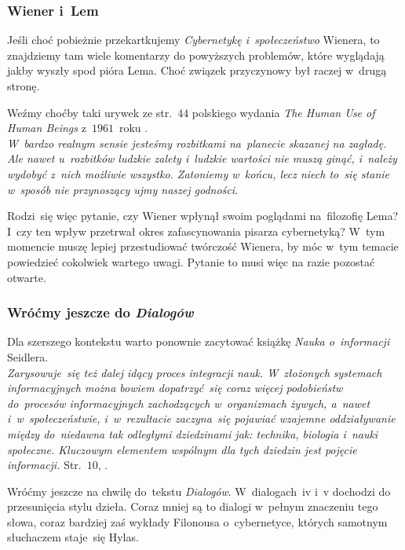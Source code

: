 \documentclass[10pt,t]{beamer}
\begin{document}
\begin{frame}
  \frametitle{Wiener i~Lem}


  Jeśli choć pobieżnie przekartkujemy \textit{Cybernetykę i~społeczeństwo}
  Wienera, to znajdziemy tam wiele komentarzy do powyższych problemów, które
  wyglądają jakby wyszły spod pióra Lema. Choć związek przyczynowy był
  raczej w~drugą stronę.

  Weźmy choćby taki urywek ze str.~$44$ polskiego wydania
  \textit{The Human Use of Human Beings} z~$1961$~roku
  \parencite{Wiener-Cybernetyka-a-spoleczenstwo-Pub-2016}. \\
  \textit{W~bardzo realnym sensie jesteśmy rozbitkami na~planecie skazanej
    na zagładę. Ale nawet u~rozbitków ludzkie zalety i~ludzkie wartości
    nie muszą ginąć, i~należy wydobyć z~nich możliwie wszystko. Zatoniemy
    w~końcu, lecz niech to~się stanie w~sposób nie przynoszący ujmy naszej
    godności.}

  Rodzi~się więc pytanie, czy Wiener wpłynął swoim poglądami na~filozofię
  Lema? I~czy ten wpływ przetrwał okres zafascynowania pisarza cybernetyką?
  W~tym momencie muszę lepiej przestudiować twórczość Wienera, by móc
  w~tym temacie powiedzieć cokolwiek wartego uwagi. Pytanie to musi więc
  na razie pozostać otwarte.

\end{frame}





\begin{frame}
  \frametitle{Wróćmy jeszcze do \textit{Dialogów}}


  Dla szerszego kontekstu warto ponownie zacytować książkę \textit{Nauka
    o~informacji} Seidlera. \\
  \textit{Zarysowuje~się też dalej idący proces integracji nauk.
    W~złożonych systemach informacyjnych można bowiem dopatrzyć~się
    coraz więcej podobieństw do~procesów informacyjnych zachodzących
    w~organizmach żywych, a~nawet i~w~społeczeństwie, i~w~rezultacie
    zaczyna~się pojawiać wzajemne oddziaływanie między do~niedawna tak
    odległymi dziedzinami jak: technika, biologia i~nauki społeczne.
    Kluczowym elementem wspólnym dla tych dziedzin jest pojęcie informacji.}
  Str.~$10$,
  \parencite{Seidler-Nauka-o-informacji-Vol-I-Pub-1983}.

  Wróćmy jeszcze na chwilę do~tekstu \textit{Dialogów}. W~dialogach~iv i~v
  dochodzi do przesunięcia stylu dzieła. Coraz mniej są to dialogi w~pełnym
  znaczeniu tego słowa, coraz bardziej zaś wykłady Filonousa o~cybernetyce,
  których samotnym słuchaczem staje~się Hylas.

\end{frame}
\end{document}
